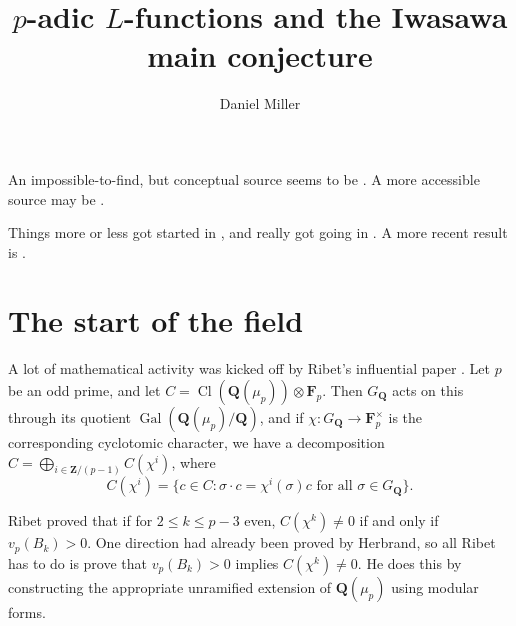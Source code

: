 \documentclass{article}
\title{$p$-adic $L$-functions and the Iwasawa main conjecture}
\author{Daniel Miller}
\DeclareMathOperator{\class}{Cl}
\DeclareMathOperator{\galois}{Gal}
\newcommand{\dF}{\mathbf{F}}
\newcommand{\dQ}{\mathbf{Q}}
\newcommand{\dZ}{\mathbf{Z}}
\begin{document}
\maketitle





An impossible-to-find, but conceptual source seems to be \cite{fk06}. A more 
accessible source may be \cite{pr00}. 

Things more or less got started in \cite{ri76}, and really got going in 
\cite{mw84}. A more recent result is \cite{su14}. 





\section{The start of the field}

A lot of mathematical activity was kicked off by Ribet's influential paper 
\cite{ri76}. Let $p$ be an odd prime, and let 
$C=\class\left(\dQ(\mu_p)\right)\otimes \dF_p$. Then $G_\dQ$ 
acts on this through its quotient $\galois(\dQ(\mu_p)/\dQ)$, and if 
$\chi:G_\dQ\to \dF_p^\times$ is the corresponding cyclotomic character, we 
have a decomposition $C=\bigoplus_{i\in \dZ/(p-1)} C(\chi^i)$, where 
\[
  C(\chi^i)=\{c\in C:\sigma \cdot c = \chi^i(\sigma) c\text{ for all }\sigma\in G_\dQ\} .
\]

Ribet proved that if for $2\leqslant k\leqslant p-3$ even, 
$C(\chi^k)\ne 0$ if and only if $v_p(B_k)>0$. One direction had already been 
proved by Herbrand, so all Ribet has to do is prove that $v_p(B_k)>0$ implies 
$C(\chi^k)\ne 0$. He does this by constructing the appropriate unramified 
extension of $\dQ(\mu_p)$ using modular forms. 







\end{document}
